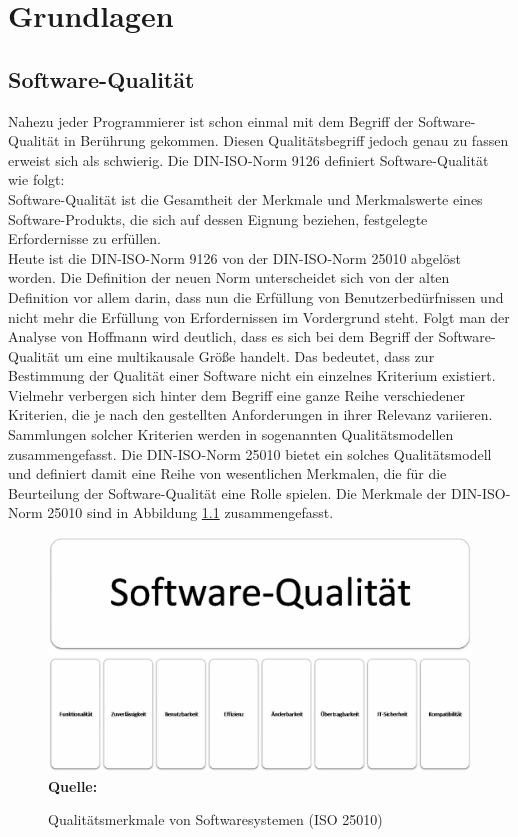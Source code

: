 \chapter{Grundlagen}
\label{sec:grundlagen}


\section{Software-Qualität}
\label{sec:softwarequalität}

Nahezu jeder Programmierer ist schon einmal mit dem Begriff der Software-Qualität in Berührung gekommen. Diesen Qualitätsbegriff jedoch genau zu fassen erweist sich als schwierig.
Die DIN-ISO-Norm 9126 definiert Software-Qualität wie folgt:
\\
\glqq Software-Qualität ist die Gesamtheit der Merkmale und Merkmalswerte eines Software-Produkts, die sich auf dessen Eignung beziehen, festgelegte Erfordernisse zu erfüllen.\grqq \cite{iso/iec_iso/iec_2001}
\\
Heute ist die DIN-ISO-Norm 9126 von der DIN-ISO-Norm 25010 \cite{iso/iec_iso/iec_2011} abgelöst worden. Die Definition der neuen Norm unterscheidet sich von der alten Definition vor allem darin, dass nun die Erfüllung von Benutzerbedürfnissen und nicht mehr die Erfüllung von Erfordernissen im Vordergrund steht.
Folgt man der Analyse von Hoffmann \cite[vgl. S.6 ff.]{hoffmann_software-qualitat_2013} wird deutlich, dass es sich bei dem Begriff der Software-Qualität um eine multikausale Größe handelt. Das bedeutet, dass zur Bestimmung der Qualität einer Software nicht ein einzelnes Kriterium existiert. Vielmehr verbergen sich hinter dem Begriff eine ganze Reihe verschiedener Kriterien, die je nach den gestellten Anforderungen in ihrer Relevanz variieren.
Sammlungen solcher Kriterien werden in sogenannten Qualitätsmodellen zusammengefasst. Die DIN-ISO-Norm 25010 \cite{iso/iec_iso/iec_2011} bietet ein solches Qualitätsmodell und definiert damit eine Reihe von wesentlichen Merkmalen, die für die Beurteilung der Software-Qualität eine Rolle spielen. Die Merkmale der DIN-ISO-Norm 25010 \cite{iso/iec_iso/iec_2011} sind in Abbildung \ref{fig:qualitaetsmerkmaleVonSoftwaresystemen} zusammengefasst.
\begin{figure}[htb]
  \centering  
  \includegraphics[scale=0.7]{img/softwarequalitaet25010.png}\\
  \footnotesize\sffamily\textbf{Quelle:} \cite{iso/iec_iso/iec_2011}
  \caption{Qualitätsmerkmale von Softwaresystemen (ISO 25010)}
  \label{fig:qualitaetsmerkmaleVonSoftwaresystemen}
\end{figure}
